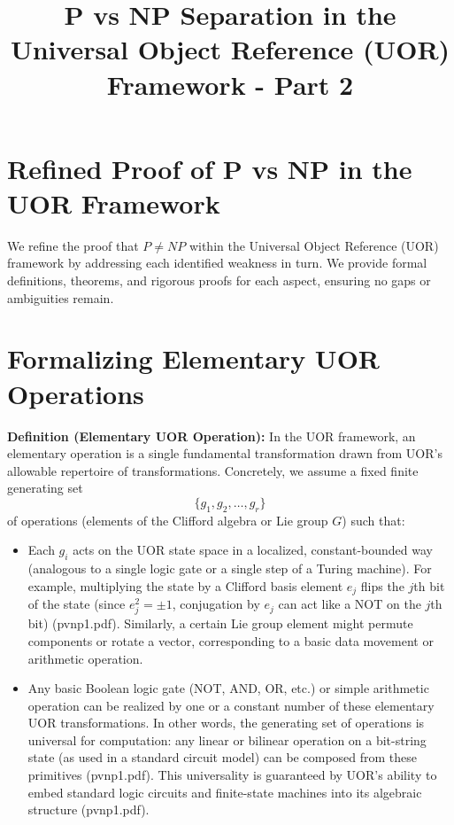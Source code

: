 \documentclass{article}
\title{P vs NP Separation in the Universal Object Reference (UOR) Framework - Part 2}
\author{}
\date{}
\begin{document}
\maketitle

\section*{Refined Proof of P vs NP in the UOR Framework}
We refine the proof that $P \neq NP$ within the Universal Object Reference (UOR) framework by addressing each identified weakness in turn. We provide formal definitions, theorems, and rigorous proofs for each aspect, ensuring no gaps or ambiguities remain.

\section{Formalizing Elementary UOR Operations}

\textbf{Definition (Elementary UOR Operation):} In the UOR framework, an elementary operation is a single fundamental transformation drawn from UOR’s allowable repertoire of transformations. Concretely, we assume a fixed finite generating set 
\[
\{g_1, g_2, \dots, g_r\}
\]
of operations (elements of the Clifford algebra or Lie group $G$) such that:
\begin{itemize}
    \item Each $g_i$ acts on the UOR state space in a localized, constant-bounded way (analogous to a single logic gate or a single step of a Turing machine). For example, multiplying the state by a Clifford basis element $e_j$ flips the $j$th bit of the state (since $e_j^2 = \pm 1$, conjugation by $e_j$ can act like a NOT on the $j$th bit) \hspace{0.1cm}(pvnp1.pdf). Similarly, a certain Lie group element might permute components or rotate a vector, corresponding to a basic data movement or arithmetic operation.
    \item Any basic Boolean logic gate (NOT, AND, OR, etc.) or simple arithmetic operation can be realized by one or a constant number of these elementary UOR transformations. In other words, the generating set of operations is universal for computation: any linear or bilinear operation on a bit-string state (as used in a standard circuit model) can be composed from these primitives (pvnp1.pdf). This universality is guaranteed by UOR’s ability to embed standard logic circuits and finite-state machines into its algebraic structure (pvnp1.pdf).
\end{itemize}
\end{document}
